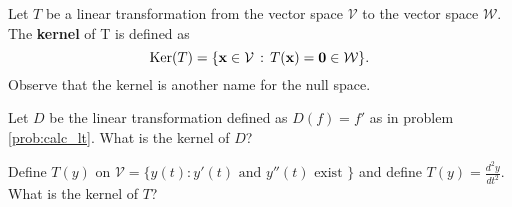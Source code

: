 \begin{definition}
    Let $T$ be a linear transformation from the vector space $\mathcal{V}$ to the vector
    space $\mathcal{W}$.  The {\bf kernel} of T is defined as
    \[ \text{Ker}(T) = \{ {\bf x} \in \mathcal{V} \, : \, T({\bf x}) = {\bf 0} \in \mathcal{W} \}. \]
    Observe that the kernel is another name for the null space.
\end{definition}


\begin{problem}
    Let $D$ be the linear transformation defined as $D(f) = f'$ as in problem
    \ref{prob:calc_lt}.  What is the kernel of $D$?
\end{problem}




\begin{problem}
    Define $T(y)$ on $\mathcal{V} = \{y(t) : y'(t) \text{ and } y''(t) \text{ exist } \}$
    and define $T(y) = \frac{d^2y}{dt^2}$.  What is the kernel of $T$?
\end{problem}

